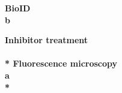 \bfseries{BioID}\\
\normalfont b

\bfseries{Inhibitor treatment}\\
\\*
\bfseries{Fluorescence microscopy}\\
\normalfont a
\\*




